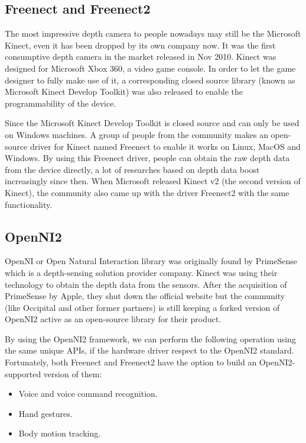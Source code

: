 \subsection{Freenect and Freenect2}
\label{sec:related_work_openiss_freenect}
The most impressive depth camera to people nowadays may still be the Microsoft 
Kinect, even it has been dropped by its own company now. It was the first 
consumptive depth camera in the market released in Nov 2010. Kinect was
designed for Microsoft Xbox 360, a video game console. In order to let the game 
designer to fully make use of it, a corresponding closed source library (known 
as Microsoft Kinect Develop Toolkit) was also released to enable the 
programmability of the device.

Since the Microsoft Kinect Develop Toolkit is closed source and can only be 
used on Windows machines. A group of people from the community makes an 
open-source driver for Kinect named Freenect to enable it works on Linux, MacOS
and Windows. By using this Freenect driver, people can obtain the raw depth 
data from the device directly, a lot of researches based on depth data boost 
increasingly since then. When Microsoft released Kinect v2 (the second version
of Kinect), the community also came up with the driver Freenect2 with the same 
functionality.

\subsection{OpenNI2}

OpenNI or Open Natural Interaction library was originally found by PrimeSense 
which is a depth-sensing solution provider company. Kinect was using their 
technology to obtain the depth data from the sensors. After the
acquisition of PrimeSense by Apple, they shut down the official website but the 
community (like Occipital and other former partners) is still keeping a forked 
version of OpenNI2 active as an open-source library for their product.

By using the OpenNI2 framework, we can perform the following operation using the
same unique APIs, if the hardware driver respect to the OpenNI2 standard.
Fortunately, both Freenect and Freenect2 have the option to build an 
OpenNI2-supported version of them:

\begin{itemize}
    \item Voice and voice command recognition.
    \item Hand gestures.
    \item Body motion tracking.
\end{itemize}

